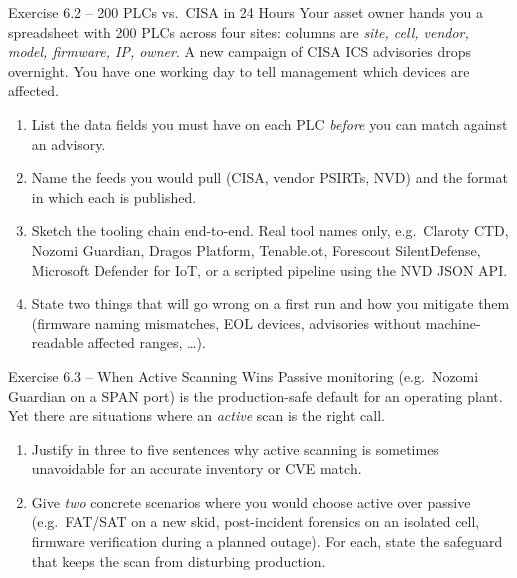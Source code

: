 \documentclass[11pt,a4paper]{article}
\begin{document}
\begin{taskbox}{Exercise 6.2 -- 200 PLCs vs.\ CISA in 24 Hours}
Your asset owner hands you a spreadsheet with 200 PLCs across four sites:
columns are \emph{site, cell, vendor, model, firmware, IP, owner}. A new
campaign of CISA ICS advisories drops overnight. You have one working
day to tell management which devices are affected.

\begin{enumerate}
  \item List the data fields you must have on each PLC \emph{before}
        you can match against an advisory.
  \item Name the feeds you would pull (CISA, vendor PSIRTs, NVD) and
        the format in which each is published.
  \item Sketch the tooling chain end-to-end. Real tool names only,
        e.g.\ Claroty CTD, Nozomi Guardian, Dragos Platform,
        Tenable.ot, Forescout SilentDefense, Microsoft Defender for
        IoT, or a scripted pipeline using the NVD JSON API.
  \item State two things that will go wrong on a first run and how
        you mitigate them (firmware naming mismatches, EOL devices,
        advisories without machine-readable affected ranges, \ldots).
\end{enumerate}
\end{taskbox}

\begin{taskbox}{Exercise 6.3 -- When Active Scanning Wins}
Passive monitoring (e.g.\ Nozomi Guardian on a SPAN port) is the
production-safe default for an operating plant. Yet there are situations
where an \emph{active} scan is the right call.

\begin{enumerate}
  \item Justify in three to five sentences why active scanning is
        sometimes unavoidable for an accurate inventory or CVE match.
  \item Give \emph{two} concrete scenarios where you would choose
        active over passive (e.g.\ FAT/SAT on a new skid, post-incident
        forensics on an isolated cell, firmware verification during a
        planned outage). For each, state the safeguard that keeps the
        scan from disturbing production.
\end{enumerate}
\end{taskbox}
\end{document}
